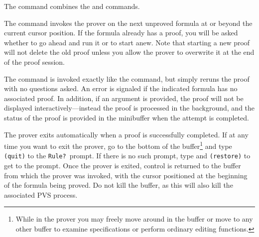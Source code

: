 The  command combines the  and
 commands.

The  command invokes the prover on the
next unproved formula at or beyond the current cursor position.  If the
formula already has a proof, you will be asked whether to go ahead and run
it or to start anew.  Note that starting a new proof will not delete the
old proof unless you allow the prover to overwrite it at the end of the
proof session.

The  command is invoked exactly like the 
command, but simply reruns the proof with no questions asked.  An
error is signaled if the indicated formula has no associated proof.
In addition, if an argument is provided, the proof will not be
displayed interactively---instead the proof is processed in the
background, and the status of the proof is provided in the minibuffer
when the attempt is completed.

The prover exits automatically when a proof is successfully completed.  If
at any time you want to exit the prover, go to the bottom of the
 buffer\footnote{While in the prover you may freely move
around in the  buffer or move to any other buffer to examine
specifications or perform ordinary editing functions.} and type
\texttt{(quit)} to the \texttt{Rule?}\ prompt.  If there is no such
prompt, type  and \texttt{(restore)} to get to the prompt.
Once the prover is exited, control is returned to the buffer from which
the prover was invoked, with the cursor positioned at the beginning of the
formula being proved.  Do not kill the  buffer, as
this will also kill the associated PVS process.

